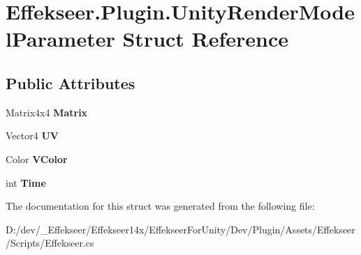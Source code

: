 \hypertarget{struct_effekseer_1_1_plugin_1_1_unity_render_model_parameter}{\section{Effekseer.\-Plugin.\-Unity\-Render\-Model\-Parameter Struct Reference}
\label{struct_effekseer_1_1_plugin_1_1_unity_render_model_parameter}
}
\subsection*{Public Attributes}
\begin{DoxyCompactItemize}
\item 
\hypertarget{struct_effekseer_1_1_plugin_1_1_unity_render_model_parameter_a45188a3e855fd4d34971f9c6bed56399}{Matrix4x4 {\bfseries Matrix}}\label{struct_effekseer_1_1_plugin_1_1_unity_render_model_parameter_a45188a3e855fd4d34971f9c6bed56399}

\item 
\hypertarget{struct_effekseer_1_1_plugin_1_1_unity_render_model_parameter_aa68ed1ffbf112a6dd6bd7be2b9d12a82}{Vector4 {\bfseries U\-V}}\label{struct_effekseer_1_1_plugin_1_1_unity_render_model_parameter_aa68ed1ffbf112a6dd6bd7be2b9d12a82}

\item 
\hypertarget{struct_effekseer_1_1_plugin_1_1_unity_render_model_parameter_ad5f2a367459643e02a7ff51ef3431b05}{Color {\bfseries V\-Color}}\label{struct_effekseer_1_1_plugin_1_1_unity_render_model_parameter_ad5f2a367459643e02a7ff51ef3431b05}

\item 
\hypertarget{struct_effekseer_1_1_plugin_1_1_unity_render_model_parameter_ac330aebed8c988a8a80da910fd0690d2}{int {\bfseries Time}}\label{struct_effekseer_1_1_plugin_1_1_unity_render_model_parameter_ac330aebed8c988a8a80da910fd0690d2}

\end{DoxyCompactItemize}


The documentation for this struct was generated from the following file\-:\begin{DoxyCompactItemize}
\item 
D\-:/dev/\-\_\-\-Effekseer/\-Effekseer14x/\-Effekseer\-For\-Unity/\-Dev/\-Plugin/\-Assets/\-Effekseer/\-Scripts/Effekseer.\-cs\end{DoxyCompactItemize}
